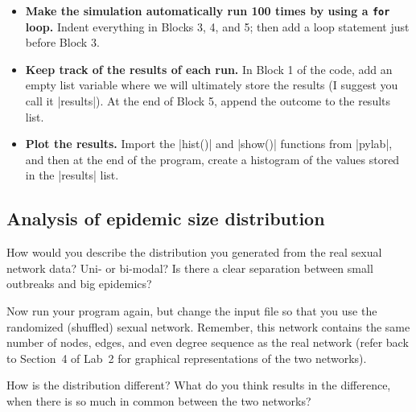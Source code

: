 \documentclass{article}
\begin{document}
\begin{itemize}
\item \textbf{Make the simulation automatically run 100 times by using a \texttt{for} loop.}  Indent everything in Blocks 3, 4, and 5; then add
a loop statement just before Block 3.
\item \textbf{Keep track of the results of each run.}  In Block 1 of the code, add an empty list variable where we will ultimately store the results (I suggest you call it |results|).  
At the end of Block 5, append the outcome to the results list.
\item \textbf{Plot the results.}  Import the |hist()| and |show()| functions from |pylab|, and then at 
the end of the program, create a histogram of the values stored in the |results| list.
\end{itemize}

\subsection{Analysis of epidemic size distribution}
How would you describe the distribution you generated from the real sexual network data?  Uni- or bi-modal? Is there a clear
separation between small outbreaks and big epidemics?

Now run your program again, but change the input file so that you use the randomized (shuffled) sexual network.  Remember, this network contains the
same number of nodes, edges, and even degree sequence as the real network (refer back to Section~4 of Lab~2 for graphical representations of the two networks).

How is the distribution different?  What do you think results in the difference, when there is so much in common between the two networks?
\end{document}
